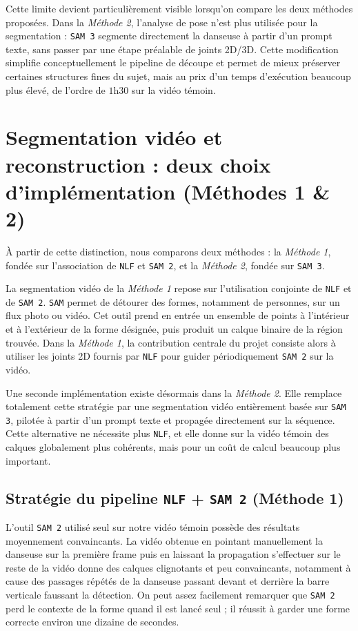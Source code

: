 \documentclass[11pt,a4paper]{article}
\begin{document}
Cette limite devient particulièrement visible lorsqu'on compare les deux méthodes proposées.
Dans la \textit{Méthode 2}, l'analyse de pose n'est plus utilisée pour la segmentation : \texttt{SAM 3} segmente directement la danseuse à partir d'un prompt texte, sans passer par une étape préalable de joints 2D/3D.
Cette modification simplifie conceptuellement le pipeline de découpe et permet de mieux préserver certaines structures fines du sujet, mais au prix d'un temps d'exécution beaucoup plus élevé, de l'ordre de $1$h$30$ sur la vidéo témoin.

\newpage

\section{Segmentation vidéo et reconstruction : deux choix d'implémentation (Méthodes 1 \& 2)}

À partir de cette distinction, nous comparons deux méthodes : la \textit{Méthode 1}, fondée sur l'association de \texttt{NLF} et \texttt{SAM 2}, et la \textit{Méthode 2}, fondée sur \texttt{SAM 3}.

La segmentation vidéo de la \textit{Méthode 1} repose sur l'utilisation conjointe de \texttt{NLF} et de \texttt{SAM 2}. \texttt{SAM} permet de détourer des formes, notamment de personnes, sur un flux photo ou vidéo.
Cet outil prend en entrée un ensemble de points à l'intérieur et à l'extérieur de la forme désignée, puis produit un calque binaire de la région trouvée.
Dans la \textit{Méthode 1}, la contribution centrale du projet consiste alors à utiliser les joints 2D fournis par \texttt{NLF} pour guider périodiquement \texttt{SAM 2} sur la vidéo.

Une seconde implémentation existe désormais dans la \textit{Méthode 2}.
Elle remplace totalement cette stratégie par une segmentation vidéo entièrement basée sur \texttt{SAM 3}, pilotée à partir d'un prompt texte et propagée directement sur la séquence.
Cette alternative ne nécessite plus \texttt{NLF}, et elle donne sur la vidéo témoin des calques globalement plus cohérents, mais pour un coût de calcul beaucoup plus important.

\subsection{Stratégie du pipeline \texttt{NLF} + \texttt{SAM 2} (Méthode 1)}
L'outil \texttt{SAM 2} utilisé seul sur notre vidéo témoin possède des résultats moyennement convaincants.
La vidéo obtenue en pointant manuellement la danseuse sur la première frame puis en laissant la propagation s'effectuer sur le reste de la vidéo donne des calques clignotants et peu convaincants, notamment à cause des passages répétés de la danseuse passant devant et derrière la barre verticale faussant la détection.
On peut assez facilement remarquer que \texttt{SAM 2} perd le contexte de la forme quand il est lancé seul ; il réussit à garder une forme correcte environ une dizaine de secondes.
\end{document}
